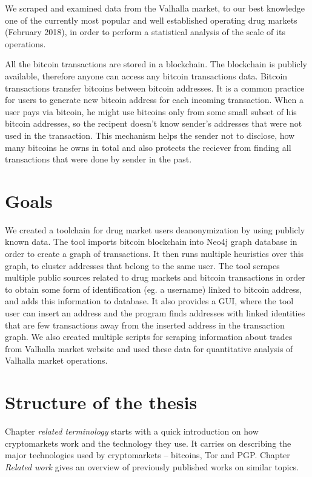 \documentclass[
  digital, %
  table,   %
  lof,     %
  lot,     %
  oneside
]{fithesis3}
\begin{document}
We scraped and examined data from the Valhalla market,
 to our best knowledge one of the currently most popular and well established operating drug markets (February 2018),
in order to perform a statistical analysis of the scale of its operations.

All the bitcoin transactions are stored in a blockchain. The blockchain is
publicly available, therefore anyone can access any bitcoin transactions data.
Bitcoin transactions transfer bitcoins between bitcoin addresses. It is a common practice for users
to generate new bitcoin address for each incoming transaction.
When a user pays via bitcoin, he might use bitcoins only from some small subset of his bitcoin addresses,
so the recipent doesn't know sender's addresses that were not used in the transaction.
This mechanism helps the sender not to disclose, how many bitcoins he owns in total and also
protects the reciever from finding all transactions that were done by sender in the past.

\section{Goals}

We created a toolchain for drug market users deanonymization by using publicly known data.
The tool imports bitcoin blockchain into Neo4j graph database in order to create a graph of transactions.
It then runs multiple heuristics over this graph, to cluster addresses that belong to the same user.
The tool scrapes multiple public sources related to drug markets and bitcoin transactions in order
to obtain some form of identification (eg. a username) linked to bitcoin address, and adds this information to database.
It also provides a GUI, where the tool user can insert an address and the program finds addresses with linked identities
that are few transactions away from the inserted address in the transaction graph.
We also created multiple scripts for scraping information about trades from Valhalla market website
and used these data for quantitative analysis of Valhalla market operations.

\section{Structure of the thesis}
Chapter \emph{related terminology} starts with a quick introduction
on how cryptomarkets work and the technology they use.
It carries on describing the major technologies used by cryptomarkets -- bitcoins, Tor and PGP.
Chapter \emph{Related work} gives an overview of previously published works on similar topics. 
\end{document}
